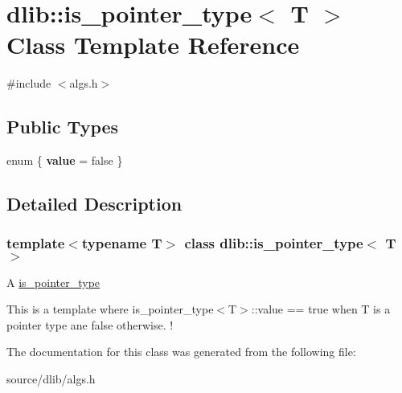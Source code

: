 \hypertarget{classdlib_1_1is__pointer__type}{
\section{dlib::is\_\-pointer\_\-type$<$ T $>$ Class Template Reference}
\label{classdlib_1_1is__pointer__type}
}


{\ttfamily \#include $<$algs.h$>$}\subsection*{Public Types}
\begin{DoxyCompactItemize}
\item 
enum \{ {\bfseries value} =  false
 \}
\end{DoxyCompactItemize}


\subsection{Detailed Description}
\subsubsection*{template$<$typename T$>$ class dlib::is\_\-pointer\_\-type$<$ T $>$}

A \hyperlink{classdlib_1_1is__pointer__type}{is\_\-pointer\_\-type}

This is a template where is\_\-pointer\_\-type$<$T$>$::value == true when T is a pointer type ane false otherwise. ! 

The documentation for this class was generated from the following file:\begin{DoxyCompactItemize}
\item 
source/dlib/algs.h\end{DoxyCompactItemize}
